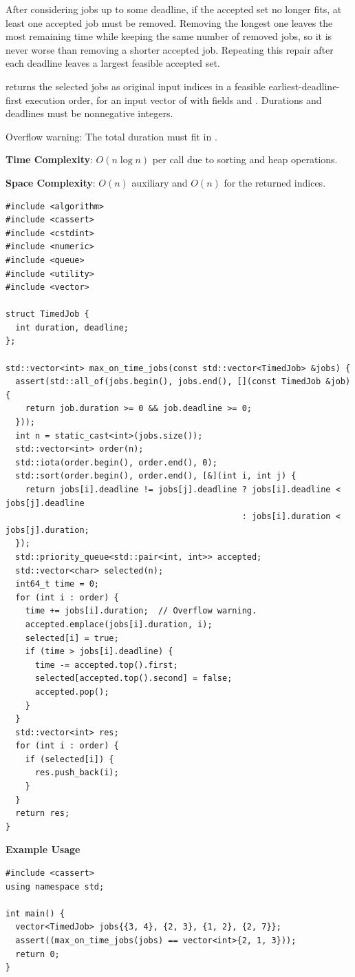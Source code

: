 After considering jobs up to some deadline, if the accepted set no longer fits, at least one accepted job must be removed. Removing the longest one leaves the most remaining time while keeping the same number of removed jobs, so it is never worse than removing a shorter accepted job. Repeating this repair after each deadline leaves a largest feasible accepted set.

\begin{compactitem}
  \item {} returns the selected jobs as original input indices in a feasible earliest-deadline-first execution order, for an input vector of  with fields  and . Durations and deadlines must be nonnegative integers.
\end{compactitem}

Overflow warning: The total duration must fit in .

\textbf{Time Complexity}: $O(n \log n)$ per call due to sorting and heap operations.

\textbf{Space Complexity}: $O(n)$ auxiliary and $O(n)$ for the returned indices.

\begin{lstlisting}[style=cpp]
#include <algorithm>
#include <cassert>
#include <cstdint>
#include <numeric>
#include <queue>
#include <utility>
#include <vector>

struct TimedJob {
  int duration, deadline;
};

std::vector<int> max_on_time_jobs(const std::vector<TimedJob> &jobs) {
  assert(std::all_of(jobs.begin(), jobs.end(), [](const TimedJob &job) {
    return job.duration >= 0 && job.deadline >= 0;
  }));
  int n = static_cast<int>(jobs.size());
  std::vector<int> order(n);
  std::iota(order.begin(), order.end(), 0);
  std::sort(order.begin(), order.end(), [&](int i, int j) {
    return jobs[i].deadline != jobs[j].deadline ? jobs[i].deadline < jobs[j].deadline
                                                : jobs[i].duration < jobs[j].duration;
  });
  std::priority_queue<std::pair<int, int>> accepted;
  std::vector<char> selected(n);
  int64_t time = 0;
  for (int i : order) {
    time += jobs[i].duration;  // Overflow warning.
    accepted.emplace(jobs[i].duration, i);
    selected[i] = true;
    if (time > jobs[i].deadline) {
      time -= accepted.top().first;
      selected[accepted.top().second] = false;
      accepted.pop();
    }
  }
  std::vector<int> res;
  for (int i : order) {
    if (selected[i]) {
      res.push_back(i);
    }
  }
  return res;
}
\end{lstlisting}
\textbf{Example Usage}\par
\begin{lstlisting}[style=cpp]
#include <cassert>
using namespace std;

int main() {
  vector<TimedJob> jobs{{3, 4}, {2, 3}, {1, 2}, {2, 7}};
  assert((max_on_time_jobs(jobs) == vector<int>{2, 1, 3}));
  return 0;
}
\end{lstlisting}
